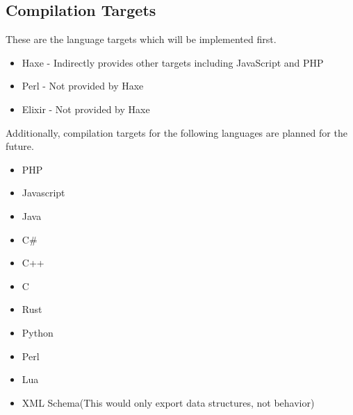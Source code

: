 \documentclass[hidelinks]{article}
\begin{document}
\subsection{Compilation Targets}
These are the language targets which will be implemented first.
	\begin{itemize}
		\item Haxe - Indirectly provides other targets including JavaScript and PHP
		\item Perl - Not provided by Haxe
		\item Elixir - Not provided by Haxe
	\end{itemize}
Additionally, compilation targets for the following languages are planned for the future.
	\begin{itemize}
		\item PHP
		\item Javascript
		\item Java
		\item C\#
		\item C++
		\item C
		\item Rust
		\item Python
		\item Perl
		\item Lua
		\item XML Schema(This would only export data structures, not behavior)
	\end{itemize}
\end{document}
